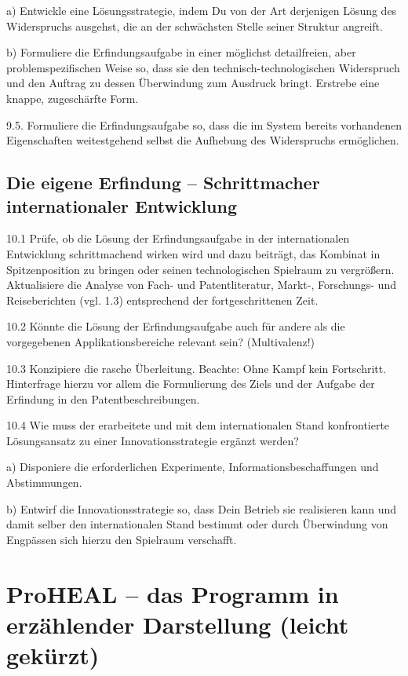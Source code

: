 \documentclass[12pt,a4paper]{article}
\begin{document}
a) Entwickle eine Lösungsstrategie, indem Du von der Art derjenigen Lösung des
Widerspruchs ausgehst, die an der schwächsten Stelle seiner Struktur angreift.

b) Formuliere die Erfindungsaufgabe in einer möglichst detailfreien, aber
problemspezifischen Weise so, dass sie den technisch-technologischen
Widerspruch und den Auftrag zu dessen Überwindung zum Ausdruck bringt. Erstrebe
eine knappe, zugeschärfte Form.

9.5.  Formuliere die Erfindungsaufgabe so, dass die im System bereits
vorhandenen Eigenschaften weitestgehend selbst die Aufhebung des Widerspruchs
ermöglichen.

\subsection{Die eigene Erfindung – Schrittmacher internationaler Entwicklung}

10.1 Prüfe, ob die Lösung der Erfindungsaufgabe in der internationalen
Entwicklung schrittmachend wirken wird und dazu beiträgt, das Kombinat in
Spitzenposition zu bringen oder seinen technologischen Spielraum zu vergrößern.
Aktualisiere die Analyse von Fach- und Patentliteratur, Markt-, Forschungs- und
Reiseberichten (vgl. 1.3) entsprechend der fortgeschrittenen Zeit.

10.2 Könnte die Lösung der Erfindungsaufgabe auch für andere als die
vorgegebenen Applikationsbereiche relevant sein? (Multivalenz!)

10.3 Konzipiere die rasche Überleitung. Beachte: Ohne Kampf kein Fortschritt.
Hinterfrage hierzu vor allem die Formulierung des Ziels und der Aufgabe der
Erfindung in den Patentbeschreibungen.

10.4 Wie muss der erarbeitete und mit dem internationalen Stand konfrontierte
Lösungsansatz zu einer Innovationsstrategie ergänzt werden?

a) Disponiere die erforderlichen Experimente, Informationsbeschaffungen und
Abstimmungen.

b) Entwirf die Innovationsstrategie so, dass Dein Betrieb sie realisieren kann
und damit selber den internationalen Stand bestimmt oder durch Überwindung von
Engpässen sich hierzu den Spielraum verschafft.

\section{ProHEAL – das Programm in erzählender Darstellung (leicht gekürzt)}
\end{document}
